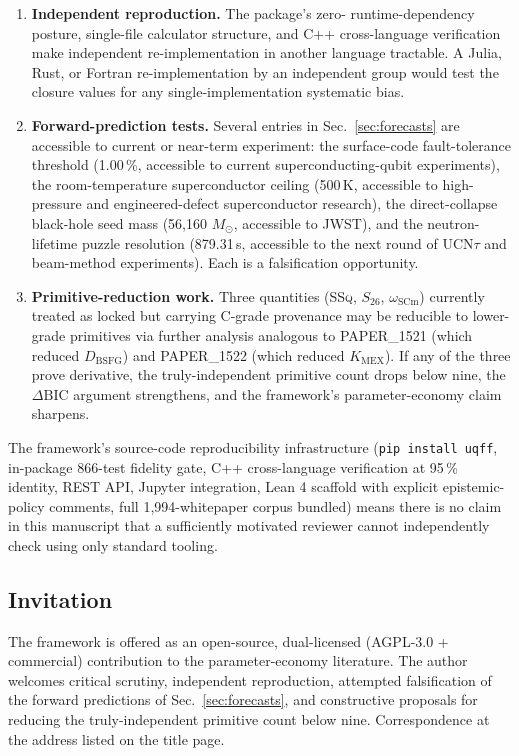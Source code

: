 \begin{enumerate}
  \item \textbf{Independent reproduction.} The package's zero-
        runtime-dependency posture, single-file calculator
        structure, and C++ cross-language verification make
        independent re-implementation in another language
        tractable. A Julia, Rust, or Fortran re-implementation by
        an independent group would test the closure values for any
        single-implementation systematic bias.
  \item \textbf{Forward-prediction tests.} Several entries in
        Sec.~\ref{sec:forecasts} are accessible to current or
        near-term experiment: the surface-code fault-tolerance
        threshold (1.00\,\%, accessible to current
        superconducting-qubit experiments), the room-temperature
        superconductor ceiling (500\,K, accessible to high-pressure
        and engineered-defect superconductor research), the
        direct-collapse black-hole seed mass (56{,}160 $M_\odot$,
        accessible to JWST), and the neutron-lifetime puzzle
        resolution (879.31\,s, accessible to the next round of
        UCN$\tau$ and beam-method experiments). Each is a
        falsification opportunity.
  \item \textbf{Primitive-reduction work.} Three quantities
        (\textsc{SSq}, $S_{26}$, $\omega_{\text{SCm}}$) currently
        treated as locked but carrying C-grade provenance may be
        reducible to lower-grade primitives via further analysis
        analogous to PAPER\_1521 (which reduced $D_{\text{BSFG}}$)
        and PAPER\_1522 (which reduced $K_{\text{MEX}}$). If any of
        the three prove derivative, the truly-independent
        primitive count drops below nine, the $\Delta\mathrm{BIC}$
        argument strengthens, and the framework's
        parameter-economy claim sharpens.
\end{enumerate}

The framework's source-code reproducibility infrastructure
(\verb|pip install uqff|, in-package 866-test fidelity gate, C++
cross-language verification at 95\,\% identity, REST API, Jupyter
integration, Lean 4 scaffold with explicit epistemic-policy
comments, full 1{,}994-whitepaper corpus bundled) means there is
no claim in this manuscript that a sufficiently motivated
reviewer cannot independently check using only standard tooling.

\subsection{Invitation}
\label{sec:invitation}

The framework is offered as an open-source, dual-licensed
(AGPL-3.0 + commercial) contribution to the parameter-economy
literature. The author welcomes critical scrutiny, independent
reproduction, attempted falsification of the forward predictions
of Sec.~\ref{sec:forecasts}, and constructive proposals for
reducing the truly-independent primitive count below nine.
Correspondence at the address listed on the title page.

